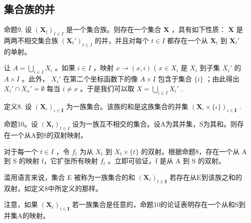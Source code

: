 \subsection{集合族的并}

命题9. 设 \((\mathbf{X}_t)_{t \in I}\) 是一个集合族。则存在一个集合 \(\mathbf{X}\) ，具有如下性质： \(\mathbf{X}\) 是两两不相交集合族 \((\mathbf{X}_t')_{t \in I}\) 的并，并且对每个 \(t \in I\) 都存在一个从 \(\mathbf{X}_t\) 到 \(\mathbf{X}_t'\) 的单射。

让 \(A = \bigcup_{i \in I} X_i\) 。如果 \(i \in I\) ，映射 \(x \to (x, i)\) ( \(x \in X_i\) 是 \(X_i\) 到子集 \(X_i'\) 的 \(A \times I\) 。此外， \(X_i'\) 在第二个坐标函数下的像 \(A \times I\) 包含于集合 \(\{i\}\) ；由此得出 \(X_i' \cap X_x' = \emptyset\) 每当 \(i \neq x\) 。于是我们可以取 \(X = \bigcup_{i \in I} X_i'\) .

定义8. 设 \((\mathbf{X}_{\iota})_{\iota \in \mathbf{I}}\) 为一族集合。该族的和是这族集合的并集 \((\mathbf{X}_{\iota} \times \{\iota\})_{\iota \in \mathbf{I}}\) .

命题10。设 \((\mathbf{X}_t)_{t\in I}\) 设为一族互不相交的集合。设A为其并集，S为其和。则存在一个从A到S的双射映射。

对于每一个 \(t \in I\) ，令 \(f_{t}\) 为从 \(X_{t}\) 到 \(X_{t} \times \{t\}\) 的双射。根据命题8，存在一个从 A 到 S 的映射 f，它扩张所有映射 \(f_{t}\) 。立即可验证，f 是从 A 到 S 的双射。

滥用语言来说，集合 E 被称为一族集合的和 \((\mathbf{X}_{t})_{t\in\mathbf{I}}\) 若存在从E到该族之和的双射，如定义8中所定义的那样。

注意，如果 \((\mathbf{X}_{t})_{i\in\mathbf{I}}\) 若一族集合是任意的，命题10的论证表明存在一个从和S到并集A的映射。

